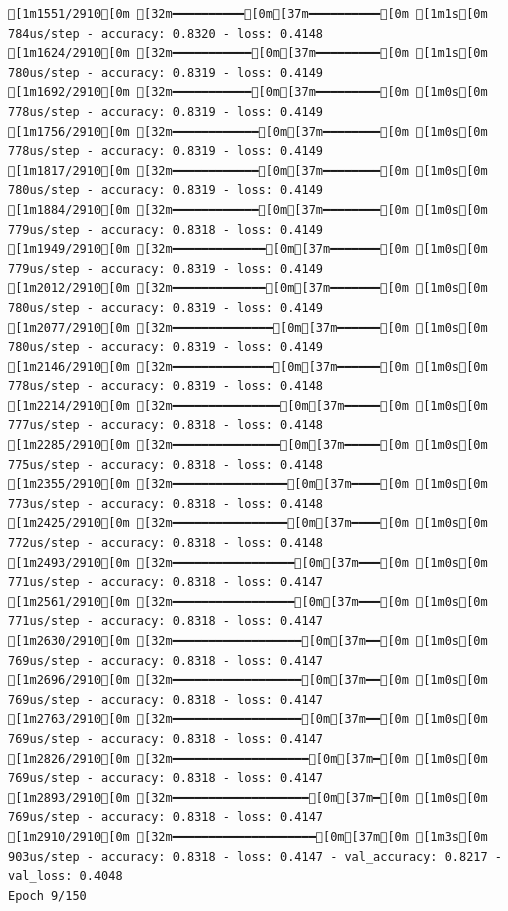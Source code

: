 \documentclass[
  letterpaper,
  DIV=11,
  numbers=noendperiod]{scrartcl}
\begin{document}
\begin{verbatim}
[1m1551/2910[0m [32m━━━━━━━━━━[0m[37m━━━━━━━━━━[0m [1m1s[0m 784us/step - accuracy: 0.8320 - loss: 0.4148
[1m1624/2910[0m [32m━━━━━━━━━━━[0m[37m━━━━━━━━━[0m [1m1s[0m 780us/step - accuracy: 0.8319 - loss: 0.4149
[1m1692/2910[0m [32m━━━━━━━━━━━[0m[37m━━━━━━━━━[0m [1m0s[0m 778us/step - accuracy: 0.8319 - loss: 0.4149
[1m1756/2910[0m [32m━━━━━━━━━━━━[0m[37m━━━━━━━━[0m [1m0s[0m 778us/step - accuracy: 0.8319 - loss: 0.4149
[1m1817/2910[0m [32m━━━━━━━━━━━━[0m[37m━━━━━━━━[0m [1m0s[0m 780us/step - accuracy: 0.8319 - loss: 0.4149
[1m1884/2910[0m [32m━━━━━━━━━━━━[0m[37m━━━━━━━━[0m [1m0s[0m 779us/step - accuracy: 0.8318 - loss: 0.4149
[1m1949/2910[0m [32m━━━━━━━━━━━━━[0m[37m━━━━━━━[0m [1m0s[0m 779us/step - accuracy: 0.8319 - loss: 0.4149
[1m2012/2910[0m [32m━━━━━━━━━━━━━[0m[37m━━━━━━━[0m [1m0s[0m 780us/step - accuracy: 0.8319 - loss: 0.4149
[1m2077/2910[0m [32m━━━━━━━━━━━━━━[0m[37m━━━━━━[0m [1m0s[0m 780us/step - accuracy: 0.8319 - loss: 0.4149
[1m2146/2910[0m [32m━━━━━━━━━━━━━━[0m[37m━━━━━━[0m [1m0s[0m 778us/step - accuracy: 0.8319 - loss: 0.4148
[1m2214/2910[0m [32m━━━━━━━━━━━━━━━[0m[37m━━━━━[0m [1m0s[0m 777us/step - accuracy: 0.8318 - loss: 0.4148
[1m2285/2910[0m [32m━━━━━━━━━━━━━━━[0m[37m━━━━━[0m [1m0s[0m 775us/step - accuracy: 0.8318 - loss: 0.4148
[1m2355/2910[0m [32m━━━━━━━━━━━━━━━━[0m[37m━━━━[0m [1m0s[0m 773us/step - accuracy: 0.8318 - loss: 0.4148
[1m2425/2910[0m [32m━━━━━━━━━━━━━━━━[0m[37m━━━━[0m [1m0s[0m 772us/step - accuracy: 0.8318 - loss: 0.4148
[1m2493/2910[0m [32m━━━━━━━━━━━━━━━━━[0m[37m━━━[0m [1m0s[0m 771us/step - accuracy: 0.8318 - loss: 0.4147
[1m2561/2910[0m [32m━━━━━━━━━━━━━━━━━[0m[37m━━━[0m [1m0s[0m 771us/step - accuracy: 0.8318 - loss: 0.4147
[1m2630/2910[0m [32m━━━━━━━━━━━━━━━━━━[0m[37m━━[0m [1m0s[0m 769us/step - accuracy: 0.8318 - loss: 0.4147
[1m2696/2910[0m [32m━━━━━━━━━━━━━━━━━━[0m[37m━━[0m [1m0s[0m 769us/step - accuracy: 0.8318 - loss: 0.4147
[1m2763/2910[0m [32m━━━━━━━━━━━━━━━━━━[0m[37m━━[0m [1m0s[0m 769us/step - accuracy: 0.8318 - loss: 0.4147
[1m2826/2910[0m [32m━━━━━━━━━━━━━━━━━━━[0m[37m━[0m [1m0s[0m 769us/step - accuracy: 0.8318 - loss: 0.4147
[1m2893/2910[0m [32m━━━━━━━━━━━━━━━━━━━[0m[37m━[0m [1m0s[0m 769us/step - accuracy: 0.8318 - loss: 0.4147
[1m2910/2910[0m [32m━━━━━━━━━━━━━━━━━━━━[0m[37m[0m [1m3s[0m 903us/step - accuracy: 0.8318 - loss: 0.4147 - val_accuracy: 0.8217 - val_loss: 0.4048
Epoch 9/150


\end{verbatim}
\end{document}
